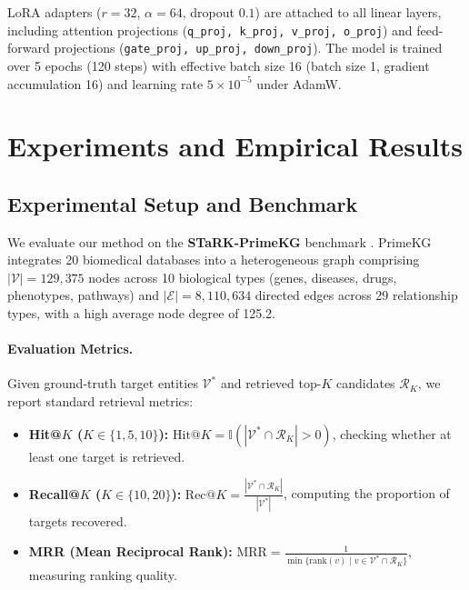 \documentclass[11pt]{article}
\begin{document}
LoRA adapters ($r=32$, $\alpha=64$, dropout $0.1$) are attached to all linear layers, including attention projections (\texttt{q\_proj, k\_proj, v\_proj, o\_proj}) and feed-forward projections (\texttt{gate\_proj, up\_proj, down\_proj}). The model is trained over 5 epochs (120 steps) with effective batch size 16 (batch size 1, gradient accumulation 16) and learning rate $5\times 10^{-5}$ under AdamW.

\section{Experiments and Empirical Results}
\label{sec:experiments}

\subsection{Experimental Setup and Benchmark}
We evaluate our method on the \textbf{STaRK-PrimeKG} benchmark \citep{wu2024stark,chandak2023primekg}. PrimeKG integrates 20 biomedical databases into a heterogeneous graph comprising $|\mathcal{V}| = 129,375$ nodes across 10 biological types (genes, diseases, drugs, phenotypes, pathways) and $|\mathcal{E}| = 8,110,634$ directed edges across 29 relationship types, with a high average node degree of 125.2.

\paragraph{Evaluation Metrics.}
Given ground-truth target entities $\mathcal{V}^*$ and retrieved top-$K$ candidates $\mathcal{R}_K$, we report standard retrieval metrics:
\begin{itemize}[leftmargin=*]
    \item \textbf{Hit@$K$ ($K \in \{1, 5, 10\}$):} $\text{Hit@}K = \mathbb{I}(|\mathcal{V}^* \cap \mathcal{R}_K| > 0)$, checking whether at least one target is retrieved.
    \item \textbf{Recall@$K$ ($K \in \{10, 20\}$):} $\text{Rec@}K = \frac{|\mathcal{V}^* \cap \mathcal{R}_K|}{|\mathcal{V}^*|}$, computing the proportion of targets recovered.
    \item \textbf{MRR (Mean Reciprocal Rank):} $\text{MRR} = \frac{1}{\min \{ \text{rank}(v) \mid v \in \mathcal{V}^* \cap \mathcal{R}_K \}}$, measuring ranking quality.
\end{itemize}
\end{document}
